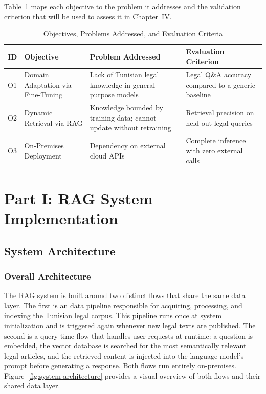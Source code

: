 Table~\ref{tab:objectives-mapping} maps each objective to the problem it addresses and the validation criterion that will be used to assess it in Chapter~IV.

\begin{table}[H]
\centering
\caption{Objectives, Problems Addressed, and Evaluation Criteria}
\label{tab:objectives-mapping}
\renewcommand{\arraystretch}{1.3}
\begin{tabular}{|p{0.8cm}|p{3.5cm}|p{4cm}|p{4cm}|}
\hline
\textbf{ID} & \textbf{Objective} & \textbf{Problem Addressed} & \textbf{Evaluation Criterion} \\
\hline
O1 & Domain Adaptation via Fine-Tuning &
Lack of Tunisian legal knowledge in general-purpose models &
Legal Q\&A accuracy compared to a generic baseline \\
\hline
O2 & Dynamic Retrieval via RAG &
Knowledge bounded by training data; cannot update without retraining &
Retrieval precision on held-out legal queries \\
\hline
O3 & On-Premises Deployment &
Dependency on external cloud \ac{API}s &
Complete inference with zero external calls \\
\hline
\end{tabular}
\end{table}


\section{Part I: RAG System Implementation}
\label{sec:part1-rag}

\subsection{System Architecture}
\label{sec:rag-system-architecture}

\subsubsection{Overall Architecture}

The \ac{RAG} system is built around two distinct flows that share the same data layer. The first is an data pipeline responsible for acquiring, processing, and indexing the Tunisian legal corpus. This pipeline runs once at system initialization and is triggered again whenever new legal texts are published. The second is a query-time flow that handles user requests at runtime: a question is embedded, the vector database is searched for the most semantically relevant legal articles, and the retrieved content is injected into the language model's prompt before generating a response. Both flows run entirely on-premises. Figure~\ref{fig:system-architecture} provides a visual overview of both flows and their shared data layer.

